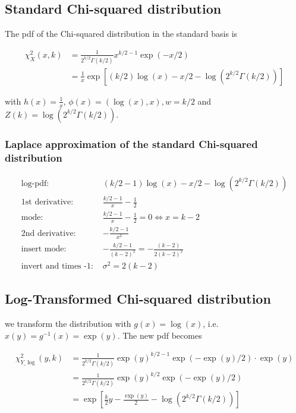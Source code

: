 \subsection{Standard Chi-squared distribution}

The pdf of the Chi-squared distribution in the standard basis is

\begin{subequations}
\begin{align}\label{eq:chi2_pdf}
	\chi^2_X(x, k) &= \frac{1}{2^{k/2}\Gamma(k/2)}  x^{k/2 -1} \exp(-x/2) \\
	&= \frac{1}{x}\exp \left[(k/2)\log(x) - x/2 - \log(2^{k/2}\Gamma(k/2))\right]
\end{align} 
\end{subequations}

with $h(x)=\frac{1}{x}$, $\phi(x) = (\log(x), x), w = k/2$ and $Z(k) = \log(2^{k/2}\Gamma(k/2))$.

\subsubsection{Laplace approximation of the standard Chi-squared distribution}

\begin{align*}
\text{log-pdf: } &(k/2-1)\log(x) - x/2 - \log(2^{k/2}\Gamma(k/2)) \\
\text{1st derivative: }&  \frac{k/2-1}{x} - \frac{1}{2} \\
\text{mode: }&  \frac{k/2-1}{x} - \frac{1}{2} = 0 \Leftrightarrow x = k-2\\
\text{2nd derivative: }&  -\frac{k/2-1}{x^2}\\
\text{insert mode: }& -\frac{k/2-1}{(k-2)^2} = -\frac{(k-2)}{2(k-2)^2}\\
\text{invert and times -1: }&\sigma^2 = 2(k-2)
\end{align*}

\subsection{Log-Transformed Chi-squared distribution}

we transform the distribution with $g(x) = \log(x)$, i.e. $x(y) = g^{-1}(x) = \exp(y)$. The new pdf becomes

\begin{subequations}
\begin{align}
	\chi^2_{Y\_\log}(y,k) &= \frac{1}{2^{k/2}\Gamma(k/2)}  \exp(y)^{k/2 -1} \exp(-\exp(y)/2) \cdot \exp(y) \\
	&= \frac{1}{2^{k/2}\Gamma(k/2)}  \exp(y)^{k/2} \exp(-\exp(y)/2) \\
	&= \exp\left[\frac{k}{2}y - \frac{\exp(y)}{2} - \log(2^{k/2}\Gamma(k/2))\right]
\end{align}
\end{subequations}

